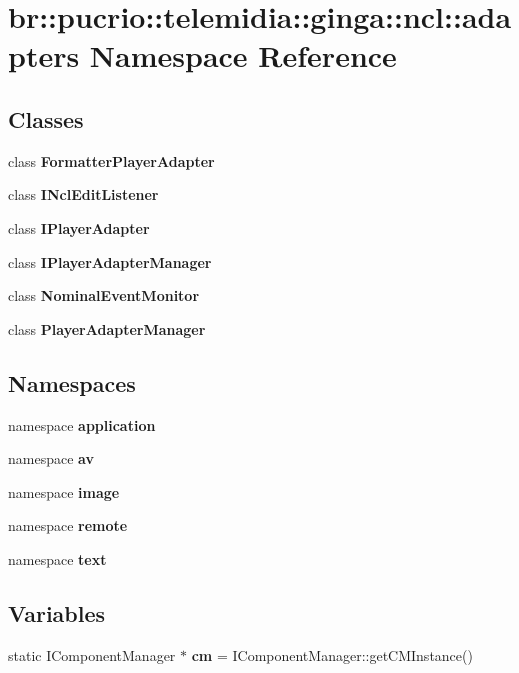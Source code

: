 \section{br::pucrio::telemidia::ginga::ncl::adapters Namespace Reference}
\label{namespacebr_1_1pucrio_1_1telemidia_1_1ginga_1_1ncl_1_1adapters}


\subsection*{Classes}
\begin{CompactItemize}
\item 
class {\bf FormatterPlayerAdapter}
\item 
class {\bf INclEditListener}
\item 
class {\bf IPlayerAdapter}
\item 
class {\bf IPlayerAdapterManager}
\item 
class {\bf NominalEventMonitor}
\item 
class {\bf PlayerAdapterManager}
\end{CompactItemize}
\subsection*{Namespaces}
\begin{CompactItemize}
\item 
namespace {\bf application}
\item 
namespace {\bf av}
\item 
namespace {\bf image}
\item 
namespace {\bf remote}
\item 
namespace {\bf text}
\end{CompactItemize}
\subsection*{Variables}
\begin{CompactItemize}
\item 
static IComponentManager $\ast$ {\bf cm} = IComponentManager::getCMInstance()\label{namespacebr_1_1pucrio_1_1telemidia_1_1ginga_1_1ncl_1_1adapters_6d6e10571951a3a8a29be92d7f31a963}

\end{CompactItemize}

